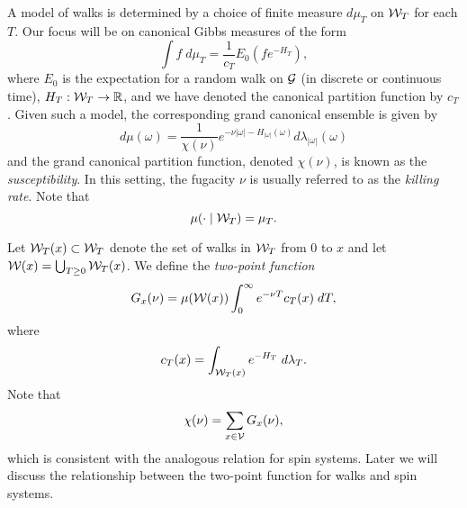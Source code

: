 A model of walks is determined by a choice of finite measure $d\mu_T$ on
$\mathcal{W}_T$ for each $T$. Our focus will be on canonical Gibbs measures of the form
\begin{equation}
\int f \; d\mu_T = \frac{1}{c_T} E_0 (f e^{-H_T}),
\end{equation}
where $E_0$ is the expectation for a random walk on $\mathcal{G}$ (in discrete or continuous time), $H_T : \mathcal{W}_T \rightarrow {\mathbb R}$, and we have denoted the canonical partition function by $c_T$.
Given such a model, the corresponding grand canonical ensemble is given by
\begin{equation}
d\mu(\omega)
  =
\frac{1}{\chi(\nu)}
e^{-\nu |\omega| - H_{|\omega|}(\omega)}
d\lambda_{|\omega|}(\omega)
\end{equation}
and the grand canonical partition function, denoted $\chi(\nu)$, is known as the \emph{susceptibility}. In this setting, the fugacity $\nu$ is usually referred to as the \emph{killing rate}.
Note that
\begin{equation}
\mu(\cdot \mid \mathcal{W}_T) = \mu_T.
\end{equation}

Let $\mathcal{W}_T(x) \subset \mathcal{W}_T$ denote the set of walks in $\mathcal{W}_T$ from $0$ to $x$ and let $\mathcal{W}(x) = \bigcup_{T \ge 0} \mathcal{W}_T(x)$. We define the
\emph{two-point function}
\begin{equation}
G_x(\nu) = \mu(\mathcal{W}(x)) \int_0^\infty e^{-\nu T} c_T(x) \; dT,
\end{equation}
where
\begin{equation}
c_T(x) = \int_{\mathcal{W}_T(x)} e^{-H_T} \; d\lambda_T.
\end{equation}
Note that
\begin{equation}
\chi(\nu) = \sum_{x\in\mathcal{V}} G_x(\nu),
\end{equation}
which is consistent with the analogous relation for spin systems. Later we will discuss the relationship between the two-point function for walks and spin systems.

